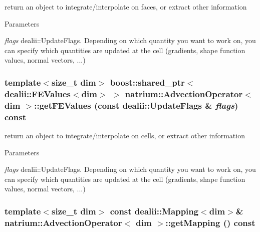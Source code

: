 return an object to integrate/interpolate on faces, or extract other information 
\begin{DoxyParams}{Parameters}
\item[{\em flags}]dealii::UpdateFlags. Depending on which quantity you want to work on, you can specify which quantities are updated at the cell (gradients, shape function values, normal vectors, ...) \end{DoxyParams}
\hypertarget{classnatrium_1_1AdvectionOperator_ae786297e9fe77377841ff7e41fcd0d01}{
\subsubsection[{getFEValues}]{\setlength{\rightskip}{0pt plus 5cm}template$<$size\_\-t dim$>$ boost::shared\_\-ptr$<$dealii::FEValues$<$dim$>$ $>$ {\bf natrium::AdvectionOperator}$<$ dim $>$::getFEValues (const dealii::UpdateFlags \& {\em flags}) const}}
\label{classnatrium_1_1AdvectionOperator_ae786297e9fe77377841ff7e41fcd0d01}


return an object to integrate/interpolate on cells, or extract other information 
\begin{DoxyParams}{Parameters}
\item[{\em flags}]dealii::UpdateFlags. Depending on which quantity you want to work on, you can specify which quantities are updated at the cell (gradients, shape function values, normal vectors, ...) \end{DoxyParams}
\hypertarget{classnatrium_1_1AdvectionOperator_aab63eee00fc2b000c3fbae9552807607}{
\subsubsection[{getMapping}]{\setlength{\rightskip}{0pt plus 5cm}template$<$size\_\-t dim$>$ const dealii::Mapping$<$dim$>$\& {\bf natrium::AdvectionOperator}$<$ dim $>$::getMapping () const}}
\label{classnatrium_1_1AdvectionOperator_aab63eee00fc2b000c3fbae9552807607}


